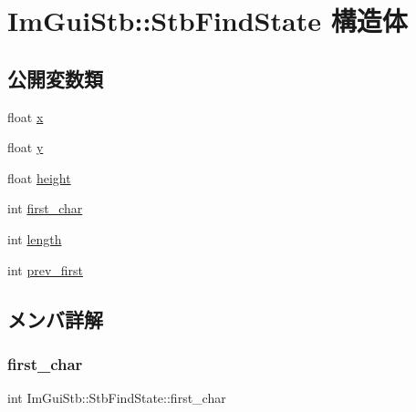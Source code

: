 \hypertarget{struct_im_gui_stb_1_1_stb_find_state}{}\section{Im\+Gui\+Stb\+:\+:Stb\+Find\+State 構造体}
\label{struct_im_gui_stb_1_1_stb_find_state}
\subsection*{公開変数類}
\begin{DoxyCompactItemize}
\item 
float \mbox{\hyperlink{struct_im_gui_stb_1_1_stb_find_state_a391de227ff11c00c2726988aed6fe5d6}{x}}
\item 
float \mbox{\hyperlink{struct_im_gui_stb_1_1_stb_find_state_a16d674ba203b37cecd265f02bc679449}{y}}
\item 
float \mbox{\hyperlink{struct_im_gui_stb_1_1_stb_find_state_a4bdad2788ba8c8785c8961e14e2529ac}{height}}
\item 
int \mbox{\hyperlink{struct_im_gui_stb_1_1_stb_find_state_a6ad39fc199ae5e89b565a6abf35fefd7}{first\+\_\+char}}
\item 
int \mbox{\hyperlink{struct_im_gui_stb_1_1_stb_find_state_a255b330cee989cac3fea58afd6f08c3d}{length}}
\item 
int \mbox{\hyperlink{struct_im_gui_stb_1_1_stb_find_state_ab0dbf2d67355b0454427a5c811c5174f}{prev\+\_\+first}}
\end{DoxyCompactItemize}


\subsection{メンバ詳解}
\mbox{\label{struct_im_gui_stb_1_1_stb_find_state_a6ad39fc199ae5e89b565a6abf35fefd7}} 
\subsubsection{\texorpdfstring{first\+\_\+char}{first\_char}}
{\footnotesize\ttfamily int Im\+Gui\+Stb\+::\+Stb\+Find\+State\+::first\+\_\+char}

\mbox{\label{struct_im_gui_stb_1_1_stb_find_state_a4bdad2788ba8c8785c8961e14e2529ac}} 
